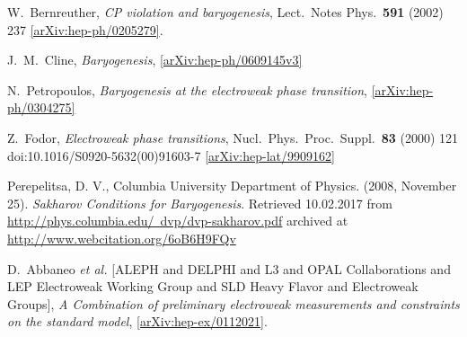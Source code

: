 \begin{thebibliography}{56}
W.~Bernreuther,
\textit{CP violation and baryogenesis},
Lect.\ Notes Phys.\  {\textbf{591}} (2002) 237
\href{https://arxiv.org/abs/hep-ph/0205279}{[arXiv:hep-ph/0205279]}.

J.~M.~Cline,
\textit{Baryogenesis}, 
\href{https://arxiv.org/abs/hep-ph/0609145v3}{[arXiv:hep-ph/0609145v3]}

N.~Petropoulos,
\textit{Baryogenesis at the electroweak phase transition},
\href{https://arxiv.org/abs/hep-ph/0304275}{[arXiv:hep-ph/0304275]}


Z.~Fodor,
\textit{Electroweak phase transitions},
Nucl.\ Phys.\ Proc.\ Suppl.\  {\textbf{83}} (2000) 121
doi:10.1016/S0920-5632(00)91603-7
\href{https://arxiv.org/abs/hep-lat/9909162v1}{[arXiv:hep-lat/9909162]}

Perepelitsa, D. V., Columbia University Department of Physics. (2008, November 25). \textit{Sakharov Conditions for Baryogenesis}. Retrieved 10.02.2017 from \href{http://phys.columbia.edu/~dvp/dvp-sakharov.pdf}{http://phys.columbia.edu/~dvp/dvp-sakharov.pdf} archived at \href{http://www.webcitation.org/6oB6H9FQv}{http://www.webcitation.org/6oB6H9FQv}


D.~Abbaneo {\textit{et al.}} [ALEPH and DELPHI and L3 and OPAL Collaborations and LEP Electroweak Working Group and SLD Heavy Flavor and Electroweak Groups],
\textit{A Combination of preliminary electroweak measurements and constraints on the standard model},
\href{https://arxiv.org/abs/hep-ex/0112021}{[arXiv:hep-ex/0112021]}.
\end{thebibliography}
